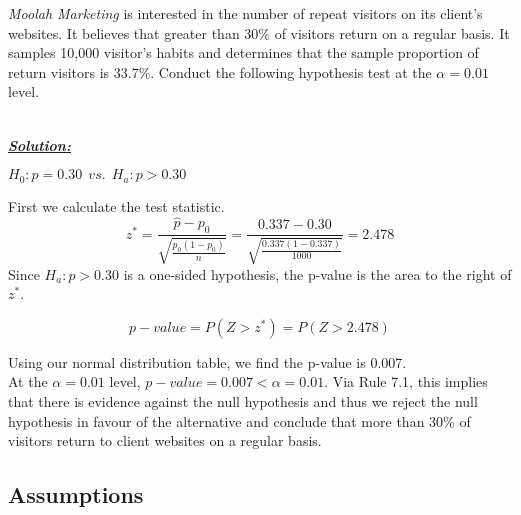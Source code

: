 \begin{example}
\textit{Moolah Marketing} is interested in the number of repeat visitors on its client's websites. It believes that greater than 30\% of visitors return on a regular basis. It samples 10,000 visitor's habits and determines that the sample proportion of return visitors is 33.7\%. Conduct the following hypothesis test at the $\alpha = 0.01$ level. 

\hfill\\
{\emph{\textbf{\underline{Solution:}}}}


\begin{center}
$H_0 : p = 0.30 ~~vs.~~ H_a : p > 0.30$
\end{center}

First we calculate the test statistic. 
\[ z^{*} = \frac{\hat{p}-p_0}{\sqrt{\displaystyle\frac{p_0(1-p_0)}{n}}} = \frac{0.337-0.30}{\sqrt{\displaystyle\frac{0.337(1-0.337)}{1000}}} = 2.478\]
Since $H_a : p > 0.30$ is a one-sided hypothesis, the p-value is the area to the right of $z^{*}$.

\[ p-value = P(Z>z^{*}) = P(Z> 2.478)\]

Using our normal distribution table, we find the p-value is 0.007. \\

At the $\alpha = 0.01$ level, $p-value = 0.007 < \alpha = 0.01$. Via Rule 7.1, this implies that there is evidence against the null hypothesis and thus we reject the null hypothesis in favour of the alternative and conclude that more than 30\% of visitors return to client websites on a regular basis. 
\end{example}












\subsection{Assumptions}

